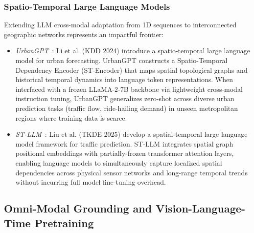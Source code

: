 \subsubsection{Spatio-Temporal Large Language Models}
Extending LLM cross-modal adaptation from 1D sequences to interconnected geographic networks represents an impactful frontier:
\begin{itemize}[leftmargin=*]
    \item \emph{UrbanGPT}~\cite{li2024urbangpt}: Li et al. (KDD 2024) introduce a spatio-temporal large language model for urban forecasting. UrbanGPT constructs a Spatio-Temporal Dependency Encoder (ST-Encoder) that maps spatial topological graphs and historical temporal dynamics into language token representations. When interfaced with a frozen LLaMA-2-7B backbone via lightweight cross-modal instruction tuning, UrbanGPT generalizes zero-shot across diverse urban prediction tasks (traffic flow, ride-hailing demand) in unseen metropolitan regions where training data is scarce.
    \item \emph{ST-LLM}~\cite{liu2024stllm}: Liu et al. (TKDE 2025) develop a spatial-temporal large language model framework for traffic prediction. ST-LLM integrates spatial graph positional embeddings with partially-frozen transformer attention layers, enabling language models to simultaneously capture localized spatial dependencies across physical sensor networks and long-range temporal trends without incurring full model fine-tuning overhead.
\end{itemize}

\subsection{Omni-Modal Grounding and Vision-Language-Time Pretraining}
\label{sec:omni_modal_pretraining}

